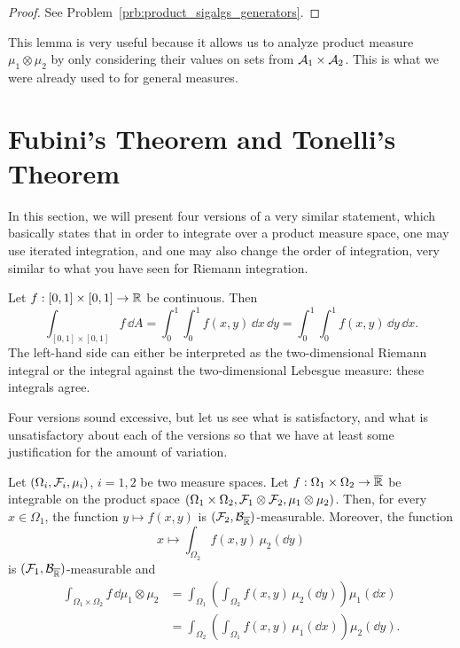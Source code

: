 \begin{proof}
See Problem~\ref{prb:product_sigalgs_generators}.
\end{proof}

This lemma is very useful because it allows us to analyze product measure $\mu_1 \otimes \mu_2$ by only considering their values on sets from $\mathcal A_1 \times \mathcal A_2$. This is what we were already used to for general measures.

\section{Fubini's Theorem and Tonelli's Theorem}

In this section, we will present four versions of a very similar statement, which basically states that in order to integrate over a product measure space, one may use iterated integration, and one may also change the order of integration, very similar to what you have seen for Riemann integration.

\begin{example}
	Let $f: [0,1]\times[0,1] \to \mathbb R$ be continuous. Then  
	\[
	\int_{[0,1]\times[0,1]} f\, \dd A = \int_0^1\!\! \int_0^1 f(x,y)\, \dd x\, \dd y = \int_0^1\!\! \int_0^1 f(x,y)\, \dd y \,\dd x.
	\]	
	The left-hand side can either be interpreted as the two-dimensional Riemann integral or the integral against the two-dimensional Lebesgue measure: these integrals agree. 
\end{example}

Four versions sound excessive, but let us see what is satisfactory, and what is unsatisfactory about each of the versions so that we have at least some justification for the amount of variation.

\begin{theorem}
Let $(\Omega_i, \mathcal F_i, \mu_i)$, $i=1,2$ be two measure spaces. 
Let $f : \Omega_1 \times \Omega_2 \to \overline{\mathbb R}$ be integrable on the product space $(\Omega_1 \times \Omega_2, \mathcal F_1 \otimes \mathcal F_2, \mu_1 \otimes \mu_2)$. Then, for every $x \in \Omega_1$, the function $y \mapsto f(x, y)$ is $(\mathcal F_2,\mathcal B_{\overline{\mathbb R}})$-measurable. Moreover, the function 
\[
x \mapsto \int_{\Omega_2} f(x,y)\,  \mu_2(\dd y)
\]
is $(\mathcal F_1,\mathcal B_{\overline{\mathbb R}})$-measurable and
\[
\begin{split}
\int_{\Omega_1 \times \Omega_2} f\, \dd \mu_1 \otimes \mu_2 
&= \int_{\Omega_1} \left( \int_{\Omega_2 } f(x,  y ) \,\mu_2(\dd y) \right) \mu_1(\dd x)\\
&= \int_{\Omega_2} \left( \int_{\Omega_1} f(x, y) \, \mu_1(\dd x) \right) \mu_2(\dd y).
\end{split}
\] 
\end{theorem}

